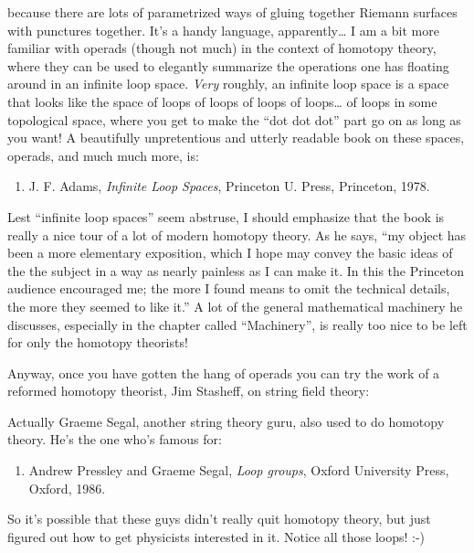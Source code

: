 \documentclass[12pt]{article}
\def\tightlist{}
\renewcommand{\texttt}[1]{%
  \begingroup
  \ttfamily
  \begingroup\lccode`~=`/\lowercase{\endgroup\def~}{/\discretionary{}{}{}}%
  \begingroup\lccode`~=`[\lowercase{\endgroup\def~}{[\discretionary{}{}{}}%
  \begingroup\lccode`~=`.\lowercase{\endgroup\def~}{.\discretionary{}{}{}}%
  \catcode`/=\active\catcode`[=\active\catcode`.=\active
  \scantokens{#1\noexpand}%
  \endgroup
}
\begin{document}
because there are lots of parametrized ways of gluing together Riemann
surfaces with punctures together. It's a handy language,
apparently\ldots{} I am a bit more familiar with operads (though not
much) in the context of homotopy theory, where they can be used to
elegantly summarize the operations one has floating around in an
infinite loop space. \emph{Very} roughly, an infinite loop space is a
space that looks like the space of loops of loops of loops of
loops\ldots{} of loops in some topological space, where you get to make
the ``dot dot dot'' part go on as long as you want! A beautifully
unpretentious and utterly readable book on these spaces, operads, and
much much more, is:

\begin{enumerate}
\def\labelenumi{\arabic{enumi})}
\setcounter{enumi}{6}
\tightlist
\item
  J. F. Adams, \emph{Infinite Loop Spaces}, Princeton U. Press,
  Princeton, 1978.
\end{enumerate}

Lest ``infinite loop spaces'' seem abstruse, I should emphasize that the
book is really a nice tour of a lot of modern homotopy theory. As he
says, ``my object has been a more elementary exposition, which I hope
may convey the basic ideas of the the subject in a way as nearly
painless as I can make it. In this the Princeton audience encouraged me;
the more I found means to omit the technical details, the more they
seemed to like it.'' A lot of the general mathematical machinery he
discusses, especially in the chapter called ``Machinery'', is really too
nice to be left for only the homotopy theorists!

Anyway, once you have gotten the hang of operads you can try the work of
a reformed homotopy theorist, Jim Stasheff, on string field theory:

\noindent
Actually Graeme Segal, another string theory guru, also used to do
homotopy theory. He's the one who's famous for:

\begin{enumerate}
\def\labelenumi{\arabic{enumi})}
\setcounter{enumi}{8}
\tightlist
\item
  Andrew Pressley and Graeme Segal, \emph{Loop groups}, Oxford
  University Press, Oxford, 1986.
\end{enumerate}
\noindent
So it's possible that these guys didn't really quit homotopy theory, but
just figured out how to get physicists interested in it. Notice all
those loops! :-)
\end{document}
